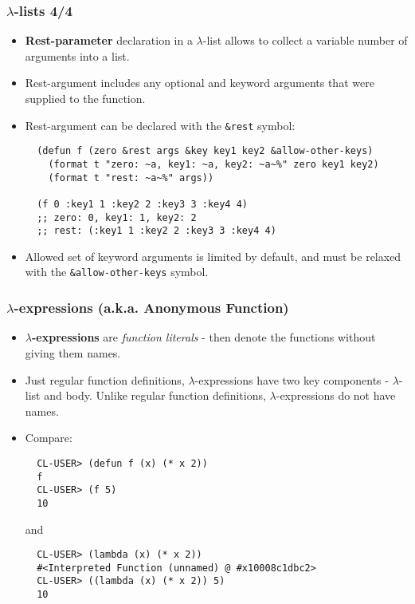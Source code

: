 \documentclass{beamer}
\begin{document}
\begin{frame}[fragile]
  \frametitle{$\lambda$-lists 4/4}
  \begin{itemize}
  \item \textbf{Rest-parameter} declaration in a $\lambda$-list allows to
    collect a variable number of arguments into a list.
  \item Rest-argument includes any optional and keyword arguments that were
    supplied to the function.
  \item Rest-argument can be declared with the \texttt{&rest} symbol:
\begin{verbatim}
  (defun f (zero &rest args &key key1 key2 &allow-other-keys)
    (format t "zero: ~a, key1: ~a, key2: ~a~%" zero key1 key2)
    (format t "rest: ~a~%" args))

  (f 0 :key1 1 :key2 2 :key3 3 :key4 4)
  ;; zero: 0, key1: 1, key2: 2
  ;; rest: (:key1 1 :key2 2 :key3 3 :key4 4)
\end{verbatim}
  \item Allowed set of keyword arguments is limited by default, and must be
    relaxed with the \texttt{&allow-other-keys} symbol.
  \end{itemize}
\end{frame}

\begin{frame}[fragile]
  \frametitle{$\lambda$-expressions (a.k.a. Anonymous Function)}
  \begin{itemize}
  \item \textbf{$\lambda$-expressions} are \textit{function literals} - then
    denote the functions without giving them names.
  \item Just regular function definitions, $\lambda$-expressions have two key
    components - $\lambda$-list and body. Unlike regular function definitions,
    $\lambda$-expressions do not have names.
  \item Compare:
\begin{verbatim}
  CL-USER> (defun f (x) (* x 2))
  f
  CL-USER> (f 5)
  10
\end{verbatim}
    and
\begin{verbatim}
  CL-USER> (lambda (x) (* x 2))
  #<Interpreted Function (unnamed) @ #x10008c1dbc2>
  CL-USER> ((lambda (x) (* x 2)) 5)
  10
\end{verbatim}
  \end{itemize}
\end{frame}
\end{document}
